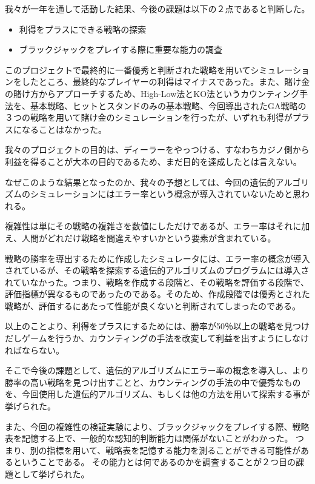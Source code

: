 我々が一年を通して活動した結果、今後の課題は以下の２点であると判断した。

\begin{itemize}
\item 利得をプラスにできる戦略の探索
\item ブラックジャックをプレイする際に重要な能力の調査
\end{itemize}

このプロジェクトで最終的に一番優秀と判断された戦略を用いてシミュレーションをしたところ、最終的なプレイヤーの利得はマイナスであった。また、賭け金の賭け方からアプローチするため、High-Low法とKO法というカウンティング手法を、基本戦略、ヒットとスタンドのみの基本戦略、今回導出されたGA戦略の３つの戦略を用いて賭け金のシミュレーションを行ったが、いずれも利得がプラスになることはなかった。

我々のプロジェクトの目的は、ディーラーをやっつける、すなわちカジノ側から利益を得ることが大本の目的であるため、まだ目的を達成したとは言えない。

なぜこのような結果となったのか、我々の予想としては、今回の遺伝的アルゴリズムのシミュレーションにはエラー率という概念が導入されていないためと思われる。

複雑性は単にその戦略の複雑さを数値にしただけであるが、エラー率はそれに加え、人間がどれだけ戦略を間違えやすいかという要素が含まれている。

戦略の勝率を導出するために作成したシミュレータには、エラー率の概念が導入されているが、その戦略を探索する遺伝的アルゴリズムのプログラムには導入されていなかった。つまり、戦略を作成する段階と、その戦略を評価する段階で、評価指標が異なるものであったのである。そのため、作成段階では優秀とされた戦略が、評価するにあたって性能が良くないと判断されてしまったのである。

以上のことより、利得をプラスにするためには、勝率が50％以上の戦略を見つけだしゲームを行うか、カウンティングの手法を改変して利益を出すようにしなければならない。

そこで今後の課題として、遺伝的アルゴリズムにエラー率の概念を導入し、より勝率の高い戦略を見つけ出すことと、カウンティングの手法の中で優秀なものを、今回使用した遺伝的アルゴリズム、もしくは他の方法を用いて探索する事が挙げられた。

また、今回の複雑性の検証実験により、ブラックジャックをプレイする際、戦略表を記憶する上で、一般的な認知的判断能力は関係がないことがわかった。
つまり、別の指標を用いて、戦略表を記憶する能力を測ることができる可能性があるということである。
その能力とは何であるのかを調査することが２つ目の課題として挙げられた。


